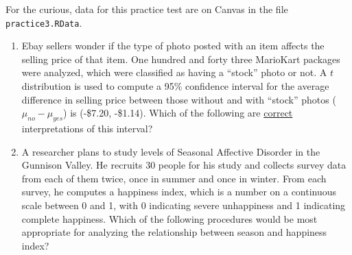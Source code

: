 \documentclass[12pt,fullpage]{amsart}
\begin{document}

For the curious, data for this practice test are on Canvas in the file \texttt{practice3.RData}. 


\begin{enumerate}

   \item
Ebay sellers wonder if the type of photo posted with an item affects the selling price of that item.  One hundred and forty three MarioKart packages were analyzed, which were classified as having a ``stock'' photo or not.  A $t$ distribution is used to compute a 95\% confidence interval for the average difference in selling price between those without and with ``stock'' photos ($\mu_{no}-\mu_{yes}$) is (-\$7.20, -\$1.14).  Which of the following are \underline{correct} interpretations of this interval?

  \vfill

\item A researcher plans to study levels of Seasonal Affective Disorder in the Gunnison Valley. He recruits 30 people for his study and collects survey data from each of them twice, once in summer and once in winter. From each survey, he computes a happiness index, which is a number on a continuous scale between 0 and 1, with 0 indicating severe unhappiness and 1 indicating complete happiness. Which of the following procedures would be most appropriate for analyzing the relationship between season and happiness index?



\end{enumerate}
\end{document}
